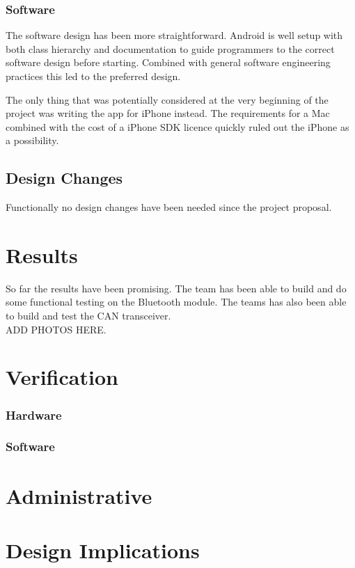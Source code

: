 \documentclass[12pt,letterpaper]{article}
\begin{document}
\subsubsection{Software}
The software design has been more straightforward. Android is well setup with both class hierarchy and documentation to guide programmers to the correct software design before starting. Combined with general software engineering practices this led to the preferred design. 

The only thing that was potentially considered at the very beginning of the project was writing the app for iPhone instead. The requirements for a Mac combined with the cost of a iPhone SDK licence quickly ruled out the iPhone as a possibility. 

\subsection{Design Changes}
Functionally no design changes have been needed since the project proposal.

\section{Results}
So far the results have been promising. The team has been able to build and do some functional testing on the Bluetooth module. The teams has also been able to build and test the CAN transceiver. \\

ADD PHOTOS HERE.

\section{Verification}
\subsubsection{Hardware}

\subsubsection{Software}


\section{Administrative}


\section{Design Implications}
\end{document}
